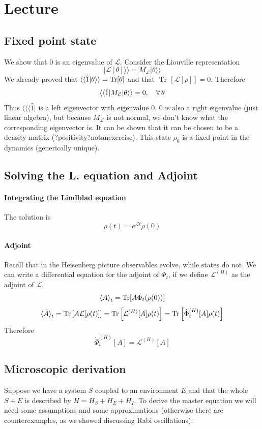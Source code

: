 \documentclass[a4paper, 11pt]{article}
\newcommand{\Tr}{\mathop{\mathrm{Tr}\!}{}}
\newcommand{\LL}{\mathcal{L}}
\newcommand\braa[1]{{\langle\langle{#1}|}}
\newcommand\kett[1]{{|{#1}\rangle\rangle}}
\begin{document}
	\section{Lecture}
	\subsection{Fixed point state}
	We show that $0$ is an eigenvalue of $\LL$. Consider the Liouville representation
	\[ \kett{\LL[\theta]} = M_\LL \kett{\theta} \]
	We already proved that $\langle\braket{\hat{1}|\theta}\rangle = \Tr[\theta]$ and that $\Tr[\LL[\rho]] = 0$. Therefore
	\[ \langle \braket{\hat{1}|M_\LL|\theta}\rangle = 0,\quad \forall\,\theta \]
	Thus $\langle\braa{\hat{1}}$ is a left eigenvector with eigenvalue 0. 0 is also a right eigenvalue (just linear algebra), but because $M_\LL$ is not normal, we don't know what the corresponding eigenvector is. It can be shown that it can be chosen to be a density matrix (?positivity?notanexercise).%
	This state $\rho_0$ is a fixed point in the dynamics (generically unique).
	
	\subsection{Solving the L. equation and Adjoint}
	
	\paragraph{Integrating the Lindblad equation}
	The solution is
	\[ \rho(t) = e^{\LL t} \rho(0) \]
	
	\paragraph{Adjoint}
	Recall that in the Heisenberg picture observables evolve, while states do not. We can write a differential equation for the adjoint of $\Phi_t$, if we define $\LL^{(H)}$ as the adjoint of $\LL$.
	\[ \braket{A}_t = \Tr[A\Phi_t(\rho(0))] \]
	\[ \dot{\braket{A}}_t = \Tr\left[ A \LL[\rho(t)] \right] = \Tr\left[ \LL^{(H)}[A] \rho(t) \right] = \Tr\left[ \dot{\Phi}^{(H)}_t [A] \rho(t) \right] \]
	Therefore
	\[ \dot{\Phi}^{(H)}_t [A] = \LL^{(H)}[A] \]
	
	\subsection{Microscopic derivation}
	Suppose we have a system $S$ coupled to an environment $E$ and that the whole $S+E$ is described by $H = H_S+H_E+H_I$. To derive the master equation we will need some assumptions and some approximations (otherwise there are counterexamples, as we showed discussing Rabi oscillations).
	
\end{document}

